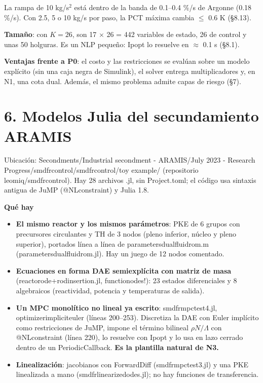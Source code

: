 \documentclass[11pt,a4paper]{article}
\newcommand{\codeus}{\textunderscore\allowbreak}
\newcommand{\code}[1]{{\small\ttfamily\let\_\codeus #1}}
\begin{document}
La rampa de 10 kg/s$^{2}$ está dentro de la banda de 0.1–0.4 \%/s de Argonne (0.18 \%/s). Con 2.5, 5 o 10 kg/s por paso, la PCT máxima cambia $\le$ 0.6 K (\S{}8.13).

\textbf{Tamaño}: con $K=26$, son 17 $\times$ 26 = 442 variables de estado, 26 de control y unas 50 holguras. Es un NLP pequeño: Ipopt lo resuelve en $\approx$ 0.1 s (\S{}8.1).

\textbf{Ventajas frente a P0}: el costo y las restricciones se evalúan sobre un modelo explícito (sin una caja negra de Simulink), el solver entrega multiplicadores y, en N1, una cota dual. Además, el mismo problema admite capas de riesgo (\S{}7).

\medskip
\section*{6. Modelos Julia del secundamiento ARAMIS}
Ubicación: \code{Secondments/Industrial secondment - ARAMIS/July 2023 - Research Progress/smdfr\_control/smdfr\_control/toy example/} (repositorio \code{leomiq/smdfr\_control}). Hay 28 archivos \code{.jl}, sin \code{Project.toml}; el código usa sintaxis antigua de JuMP (\code{@NLconstraint}) y Julia 1.8.

\textbf{Qué hay}

\begin{itemize}
\item \textbf{El mismo reactor y los mismos parámetros}: PKE de 6 grupos con precursores circulantes y TH de 3 nodos (pleno inferior, núcleo y pleno superior), portados línea a línea de \code{parameters\_dualfluid\_rom.m} (\code{parameters\_dualfluid\_rom.jl}). Hay un juego de 12 nodos comentado.
\item \textbf{Ecuaciones en forma DAE semiexplícita con matriz de masa} (\code{reactor\_ode+rod\_insertion.jl}, \code{function\_odes!}): 23 estados diferenciales y 8 algebraicos (reactividad, potencia y temperaturas de salida).
\item \textbf{Un MPC monolítico no lineal ya escrito}: \code{smdfr\_mpc\_test\_4.jl}, \code{optimizer\_implicit\_euler} (líneas 200–253). Discretiza la DAE con Euler implícito como restricciones de JuMP, impone el término bilineal $\rho N/\Lambda$ con \code{@NLconstraint} (línea 220), lo resuelve con Ipopt y lo usa en lazo cerrado dentro de un \code{PeriodicCallback}. \textbf{Es la plantilla natural de N3.}
\item \textbf{Linealización}: jacobianos con ForwardDiff (\code{smdfr\_mpc\_test\_3.jl}) y una PKE linealizada a mano (\code{smdfr\_linearized\_odes.jl}); no hay funciones de transferencia.
\end{itemize}
\end{document}
